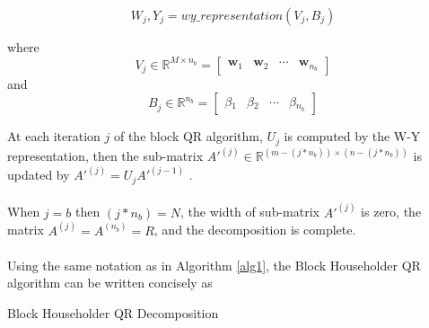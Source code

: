 \documentclass{article}
\begin{document}
\begin{equation}
W_j, Y_j = wy\_representation(V_j, B_j)
\end{equation}

where 
\begin{equation}
V_j \in \mathbb{R}^{M \times n_b} =
\begin{bmatrix}
\mathbf{w}_1 & \mathbf{w}_2 & \cdots & \mathbf{w}_{n_b}
\end{bmatrix}
\end{equation}
and
\begin{equation}
B_j \in \mathbb{R}^{n_b} = 
\begin{bmatrix}
\beta{}_1 & \beta{}_2 & \cdots & \beta{}_{n_b}
\end{bmatrix}
\end{equation}

At each iteration $j$ of the block QR algorithm, $U_j$ is computed by the W-Y representation, then the sub-matrix $A'^{(j)} \in \mathbb{R}^{(m - (j * n_b)) \times (n - (j * n_b))}$ is updated by $A'^{(j)} = U_{j}A'^{(j-1)}$ \cite{doi:10.1137/19M1296367} \cite{golub}.

\paragraph{}
When $j = b$ then $(j * n_b) = N$, the width of sub-matrix $A'^{(j)}$ is zero, the matrix $A^{(j)} = A^{(n_b)} = R$, and the decomposition is complete.

\paragraph{}
Using the same notation as in Algorithm \ref{alg1}, the Block Householder QR algorithm can be written concisely as
\begin{algorithm}
\label{blockqr}
\caption{Block Householder QR Decomposition}
\begin{algorithmic}[1]

\ENDWHILE
\end{algorithmic}
\end{algorithm}



\end{document}
